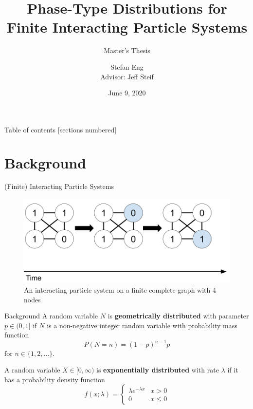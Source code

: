 \documentclass{beamer}
\title{Phase-Type Distributions for Finite Interacting Particle Systems}
\subtitle{Master's Thesis}
\author{Stefan Eng\\
    Advisor: Jeff Steif
}
\institute{Göteborgs Universitet}
\date{June 9, 2020}
\theoremstyle{definition}
\begin{document}
\maketitle

\begin{frame}{Table of contents}
  [sections numbered]
  \tableofcontents%
\end{frame}

\section{Background}

\begin{frame}{(Finite) Interacting Particle Systems}
  \begin{figure}[H]
  \centering
    \includegraphics[width=.8\textwidth]{figures/ips_overview_transitions.png}
    \caption{An interacting particle system on a finite complete graph with 4 nodes}
\end{figure}
\end{frame}

\begin{frame}{Background}
A random variable $N$ is \textbf{geometrically distributed} with parameter $p \in (0,1]$ if $N$ is a non-negative integer random variable with probability mass function
$$
P(N = n) = (1 - p)^{n - 1} p
$$
for $n \in \{1,2,\ldots\}$.

A random variable $X \in [0, \infty)$ is \textbf{exponentially distributed} with rate $\lambda$ if it has a probability density function
$$
f(x; \lambda) = \begin{cases}
    \lambda e^{-\lambda x} & x > 0\\
    0 & x \leq 0
    \end{cases}
$$
\end{frame}


\end{document}

